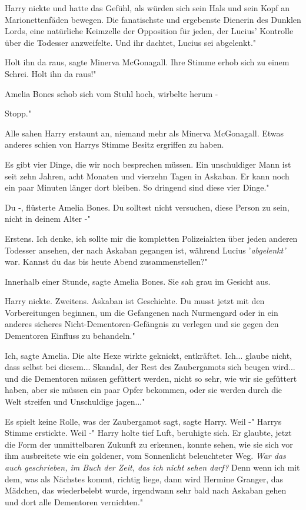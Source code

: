 Harry nickte und hatte das Gefühl, als würden sich sein Hals und sein Kopf an
Marionettenfäden bewegen. \glqq Die fanatischste und ergebenste Dienerin des
Dunklen Lords, eine natürliche Keimzelle der Opposition für jeden, der Lucius'
Kontrolle über die Todesser anzweifelte. Und ihr dachtet, Lucius sei abgelenkt."

\glqq Holt ihn da raus\grqq{}, sagte Minerva McGonagall. Ihre Stimme erhob sich
zu einem Schrei. \glqq Holt ihn da raus!"

Amelia Bones schob sich vom Stuhl hoch, wirbelte herum -

\glqq Stopp."

Alle sahen Harry erstaunt an, niemand mehr als Minerva McGonagall. Etwas anderes
schien von Harrys Stimme Besitz ergriffen zu haben.

\glqq Es gibt vier Dinge, die wir noch besprechen müssen. Ein unschuldiger Mann
ist seit zehn Jahren, acht Monaten und vierzehn Tagen in Askaban. Er kann noch
ein paar Minuten länger dort bleiben. So dringend sind diese vier Dinge."

\glqq Du -\grqq{}, flüsterte Amelia Bones. \glqq Du solltest nicht versuchen,
diese Person zu sein, nicht in deinem Alter -"

\glqq Erstens. Ich denke, ich sollte mir die kompletten Polizeiakten über jeden
anderen Todesser ansehen, der nach Askaban gegangen ist, während Lucius
'\emph{abgelenkt'} war. Kannst du das bis heute Abend zusammenstellen?"

\glqq Innerhalb einer Stunde\grqq{}, sagte Amelia Bones. Sie sah grau im Gesicht
aus.

Harry nickte. \glqq Zweitens. Askaban ist Geschichte. Du musst jetzt mit den
Vorbereitungen beginnen, um die Gefangenen nach Nurmengard oder in ein anderes
sicheres Nicht-Dementoren-Gefängnis zu verlegen und sie gegen den Dementoren
Einfluss zu behandeln."

\glqq Ich\grqq{}, sagte Amelia. Die alte Hexe wirkte geknickt, entkräftet. \glqq
Ich... glaube nicht, dass selbst bei diesem... Skandal, der Rest des
Zaubergamots sich beugen wird... und die Dementoren müssen gefüttert werden,
nicht so sehr, wie wir sie gefüttert haben, aber sie müssen ein paar Opfer
bekommen, oder sie werden durch die Welt streifen und Unschuldige jagen..."

\glqq Es spielt keine Rolle, was der Zaubergamot sagt\grqq{}, sagte Harry. \glqq
Weil -" Harrys Stimme erstickte. \glqq Weil -" Harry holte tief Luft, beruhigte
sich. Er glaubte, jetzt die Form der unmittelbaren Zukunft zu erkennen, konnte
sehen, wie sie sich vor ihm ausbreitete wie ein goldener, vom Sonnenlicht
beleuchteter Weg.
\emph{War das auch geschrieben, im Buch der Zeit, das ich nicht sehen darf?}
\glqq Denn wenn ich mit dem, was als Nächstes kommt, richtig liege, dann wird
Hermine Granger, das Mädchen, das wiederbelebt wurde, irgendwann sehr bald nach
Askaban gehen und dort alle Dementoren vernichten."

